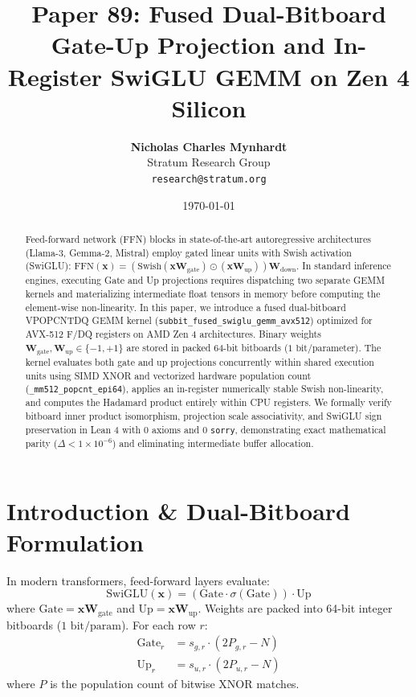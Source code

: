 \documentclass[11pt,a4paper]{article}
\title{\textbf{Paper 89: Fused Dual-Bitboard Gate-Up Projection and In-Register SwiGLU GEMM on Zen 4 Silicon}}
\author{\textbf{Nicholas Charles Mynhardt} \\ Stratum Research Group \\ \texttt{research@stratum.org}}
\date{\today}
\begin{document}
\maketitle

\begin{abstract}
Feed-forward network (FFN) blocks in state-of-the-art autoregressive architectures (Llama-3, Gemma-2, Mistral) employ gated linear units with Swish activation (SwiGLU): $\text{FFN}(\mathbf{x}) = (\text{Swish}(\mathbf{x} \mathbf{W}_{\text{gate}}) \odot (\mathbf{x} \mathbf{W}_{\text{up}})) \mathbf{W}_{\text{down}}$. In standard inference engines, executing Gate and Up projections requires dispatching two separate GEMM kernels and materializing intermediate float tensors in memory before computing the element-wise non-linearity. In this paper, we introduce a fused dual-bitboard VPOPCNTDQ GEMM kernel (\texttt{subbit\_fused\_swiglu\_gemm\_avx512}) optimized for AVX-512 F/DQ registers on AMD Zen 4 architectures. Binary weights $\mathbf{W}_{\text{gate}}, \mathbf{W}_{\text{up}} \in \{-1, +1\}$ are stored in packed 64-bit bitboards ($1\text{ bit/parameter}$). The kernel evaluates both gate and up projections concurrently within shared execution units using SIMD XNOR and vectorized hardware population count (\texttt{\_mm512\_popcnt\_epi64}), applies an in-register numerically stable Swish non-linearity, and computes the Hadamard product entirely within CPU registers. We formally verify bitboard inner product isomorphism, projection scale associativity, and SwiGLU sign preservation in Lean 4 with 0 axioms and 0 \texttt{sorry}, demonstrating exact mathematical parity ($\Delta < 1 \times 10^{-6}$) and eliminating intermediate buffer allocation.
\end{abstract}

\section{Introduction \& Dual-Bitboard Formulation}
In modern transformers, feed-forward layers evaluate:
\begin{equation}
\text{SwiGLU}(\mathbf{x}) = (\text{Gate} \cdot \sigma(\text{Gate})) \cdot \text{Up}
\end{equation}
where $\text{Gate} = \mathbf{x} \mathbf{W}_{\text{gate}}$ and $\text{Up} = \mathbf{x} \mathbf{W}_{\text{up}}$.
Weights are packed into 64-bit integer bitboards ($1\text{ bit/param}$). For each row $r$:
\begin{align}
\text{Gate}_r &= s_{g, r} \cdot (2 P_{g, r} - N) \\
\text{Up}_r &= s_{u, r} \cdot (2 P_{u, r} - N)
\end{align}
where $P$ is the population count of bitwise XNOR matches.
\end{document}
